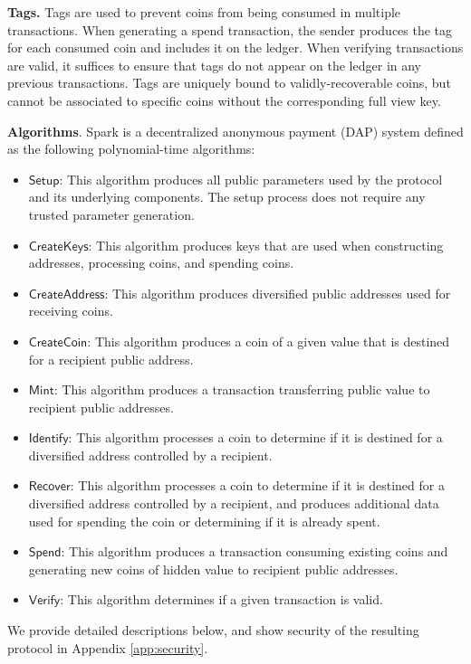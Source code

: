 \documentclass{llncs}
\newcommand{\func}[1]{\mathsf{#1}}
\begin{document}
\textbf{Tags.} Tags are used to prevent coins from being consumed in multiple transactions.
When generating a spend transaction, the sender produces the tag for each consumed coin and includes it on the ledger.
When verifying transactions are valid, it suffices to ensure that tags do not appear on the ledger in any previous transactions.
Tags are uniquely bound to validly-recoverable coins, but cannot be associated to specific coins without the corresponding full view key.

\textbf{Algorithms}. Spark is a decentralized anonymous payment (DAP) system defined as the following polynomial-time algorithms:
\begin{itemize}
\item $\func{Setup}$: This algorithm produces all public parameters used by the protocol and its underlying components.
The setup process does not require any trusted parameter generation.
\item $\func{CreateKeys}$: This algorithm produces keys that are used when constructing addresses, processing coins, and spending coins.
\item $\func{CreateAddress}$: This algorithm produces diversified public addresses used for receiving coins.
\item $\func{CreateCoin}$: This algorithm produces a coin of a given value that is destined for a recipient public address.
\item $\func{Mint}$: This algorithm produces a transaction transferring public value to recipient public addresses.
\item $\func{Identify}$: This algorithm processes a coin to determine if it is destined for a diversified address controlled by a recipient.
\item $\func{Recover}$: This algorithm processes a coin to determine if it is destined for a diversified address controlled by a recipient, and produces additional data used for spending the coin or determining if it is already spent.
\item $\func{Spend}$: This algorithm produces a transaction consuming existing coins and generating new coins of hidden value to recipient public addresses.
\item $\func{Verify}$: This algorithm determines if a given transaction is valid.
\end{itemize}

We provide detailed descriptions below, and show security of the resulting protocol in Appendix \ref{app:security}.
\end{document}
